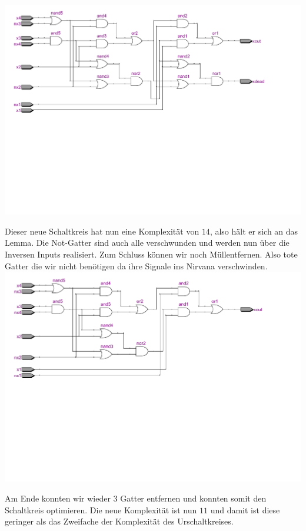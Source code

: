 \documentclass[a4paper,10pt]{article}
\begin{document}
\includegraphics[scale=0.50]{images/zwisk.pdf}

Dieser neue Schaltkreis hat nun eine Komplexit\"at von $14$, also h\"alt er sich an das Lemma. Die Not-Gatter sind auch alle verschwunden und werden nun \"uber
die Inversen Inputs realisiert. Zum Schluss k\"onnen wir noch \glqq M\"ull\grqq entfernen. Also tote Gatter die wir nicht ben\"otigen da ihre Signale ins Nirvana verschwinden.\\

\includegraphics[scale=0.50]{images/endsk.pdf}

Am Ende konnten wir wieder 3 Gatter entfernen und konnten somit den Schaltkreis optimieren. Die neue Komplexit\"at ist nun $11$ und damit ist diese geringer als das Zweifache der Komplexit\"at des Urschaltkreises.
\end{document}

